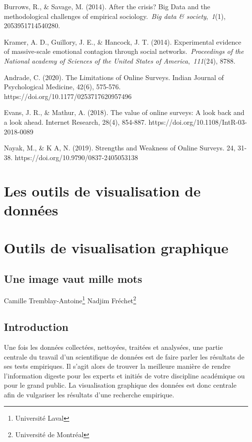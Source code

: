 \documentclass[
  letterpaper,
  DIV=11,
  numbers=noendperiod]{scrreprt}
\begin{document}
Burrows, R., \& Savage, M. (2014). After the crisis? Big Data and the
methodological challenges of empirical sociology.~\emph{Big data \&
society},~\emph{1}(1), 2053951714540280.

Kramer, A. D., Guillory, J. E., \& Hancock, J. T. (2014). Experimental
evidence of massive-scale emotional contagion through social
networks.~\emph{Proceedings of the National academy of Sciences of the
United States of America},~\emph{111}(24), 8788.

Andrade, C. (2020). The Limitations of Online Surveys. Indian Journal of
Psychological Medicine, 42(6), 575-576.
https://doi.org/10.1177/0253717620957496

\hfill\break
Evans, J. R., \& Mathur, A. (2018). The value of online surveys: A look
back and a look ahead. Internet Research, 28(4), 854-887.
https://doi.org/10.1108/IntR-03-2018-0089

\hfill\break
Nayak, M., \& K A, N. (2019). Strengths and Weakness of Online Surveys.
24, 31-38. https://doi.org/10.9790/0837-2405053138


\chapter{Les outils de visualisation de
données}\label{les-outils-de-visualisation-de-donnuxe9es}


\chapter{Outils de visualisation
graphique}\label{outils-de-visualisation-graphique}

\section{Une image vaut mille mots}\label{une-image-vaut-mille-mots}

Camille Tremblay-Antoine\footnote{Université Laval} Nadjim
Fréchet\footnote{Université de Montréal}

\section{Introduction}\label{introduction-1}

Une fois les données collectées, nettoyées, traitées et analysées, une
partie centrale du travail d'un scientifique de données est de faire
parler les résultats de ses tests empiriques. Il s'agit alors de trouver
la meilleure manière de rendre l'information digeste pour les experts et
initiés de votre discipline académique ou pour le grand public. La
visualisation graphique des données est donc centrale afin de vulgariser
les résultats d'une recherche empirique.
\end{document}
